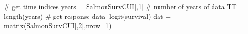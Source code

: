 \begin{Schunk}
\begin{Sinput}
 # get time indices
 years = SalmonSurvCUI[,1]
 # number of years of data
 TT = length(years)
 # get response data: logit(survival)
 dat = matrix(SalmonSurvCUI[,2],nrow=1)
\end{Sinput}
\end{Schunk}
